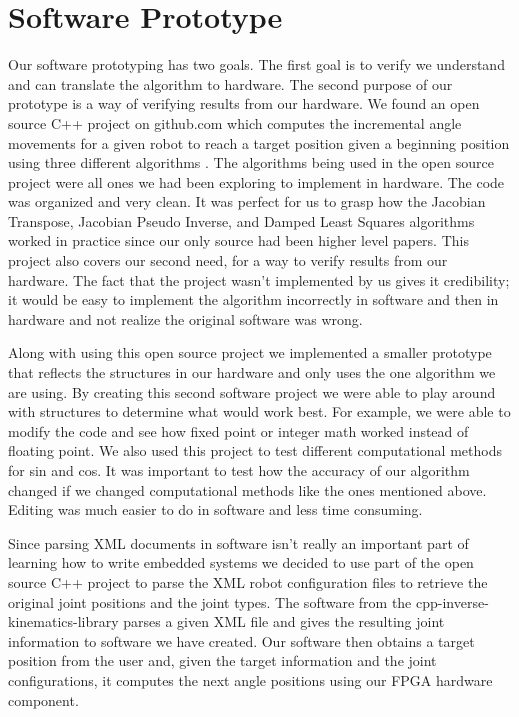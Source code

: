 \section{Software Prototype}
Our software prototyping has two goals. The first goal is to verify we 
understand and can translate the algorithm to hardware. The second 
purpose of our prototype is a way of verifying results from our hardware.
We found an open source C++ project on github.com which computes the 
incremental angle movements for a given robot to reach a target position 
given a beginning position using three different algorithms 
\cite{ik_cpp_library}. The algorithms being used in the open source project 
were all ones we had been exploring to implement in hardware. The code was 
organized and very clean. It was perfect for us to grasp how the Jacobian 
Transpose, Jacobian Pseudo Inverse, and Damped Least Squares algorithms 
worked in practice since our only source had been higher level papers. This 
project also covers our second need, for a way to verify results from our 
hardware. The fact that the project wasn't implemented by us gives it 
credibility; it would be easy to implement the algorithm incorrectly in 
software and then in hardware and not realize the original software was 
wrong. 

Along with using this open source project we implemented a smaller 
prototype that reflects the structures in our hardware and only 
uses the one algorithm we are using. By creating this second software 
project we were able to play around with structures to determine what
would work best. For example, we were able to modify the code
and see how fixed point or integer math 
worked instead of floating point. We also used this project to test different 
computational methods for sin and cos. It was important to test how the 
accuracy of our algorithm changed if we changed computational methods like 
the ones mentioned above. Editing was much easier to do in software 
and less time consuming.

Since parsing XML documents in software isn't really an important part of 
learning how to write embedded systems we decided to use part of the 
open source C++ project to parse the XML robot configuration files to 
retrieve the original joint positions and the joint types. The software 
from the cpp-inverse-kinematics-library parses a given XML file and 
gives the resulting joint information to software we have created. Our 
software then obtains a target position from the user and, given the 
target information and the joint configurations, it computes the 
next angle positions using our FPGA hardware component. 
